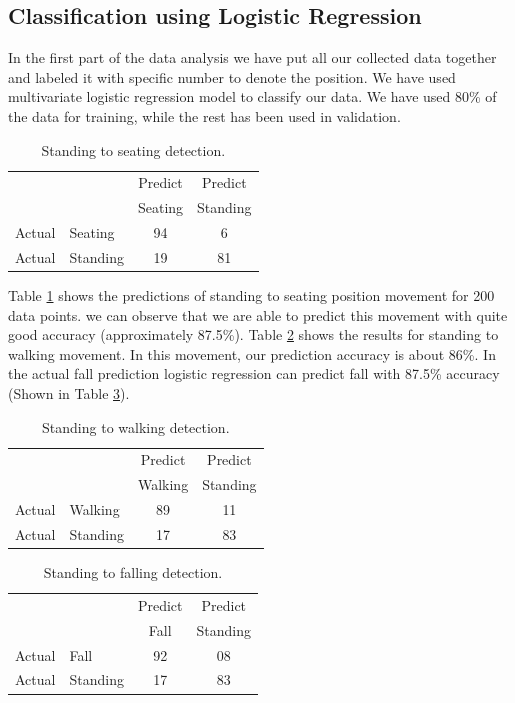 \documentclass{llncs}
\begin{document}
\begin{sloppy}
\subsection*{Classification using Logistic Regression}

In the first part of the data analysis we have put all our collected data together and labeled it
with specific number to denote the position. We have used multivariate logistic regression model to
classify our data. We have used 80\% of the data for training, while the rest has been used
in validation.

\begin{table}[!h]
	\caption{Standing to seating detection.}	
	\label{tab:StandingToSeatingDetection}
	\centering
		\begin{tabular} {l l |c |c}
			& & Predict& Predict \\ 
			& & Seating & Standing \\ \hline
			Actual& Seating & 94 & 6\\ \hline
			Actual& Standing & 19& 81\\ \hline
		\end{tabular}
\end{table}

Table \ref{tab:StandingToSeatingDetection} shows the predictions of standing to seating position
movement for 200 data points. we can observe that we are able
to predict this movement with quite good accuracy (approximately 87.5\%). Table
 \ref{tab:StandingToWalkingDetection} shows the results for  standing to walking movement. In this
movement, our prediction accuracy is about 86\%. In the actual fall prediction logistic
regression can predict fall with 87.5\% accuracy (Shown in Table
 \ref{tab:StandingToFallingDetection}).
\vspace{-5mm}
\begin{table}
\caption{Standing to walking detection.}
	\label{tab:StandingToWalkingDetection}
\centering
		\begin{tabular} {l l |c |c}
			& & Predict& Predict \\ 
			& & Walking & Standing \\ \hline
			Actual& Walking & 89 & 11\\ \hline
			Actual& Standing & 17& 83\\ \hline
		\end{tabular}
\end{table}
\vspace{-10mm}
\begin{table}[!h]
\caption{Standing to falling detection.}
\label{tab:StandingToFallingDetection}
\centering
		\begin{tabular} {l l |c |c}
			& & Predict& Predict \\ 
			& & Fall & Standing \\ \hline
			Actual& Fall & 92 & 08\\ \hline
			Actual& Standing & 17& 83\\ \hline
		\end{tabular}
\end{table}
\vspace{-5mm}

\end{sloppy}
\end{document}
